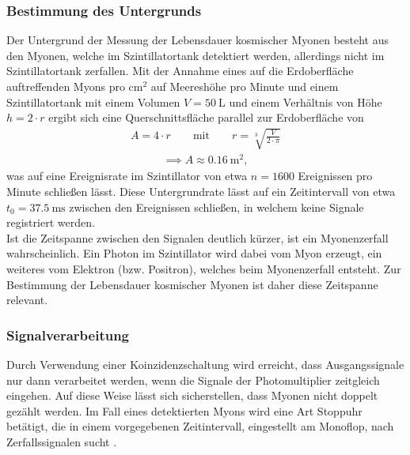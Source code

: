 \subsubsection{Bestimmung des Untergrunds}
\noindent Der Untergrund der Messung der Lebensdauer kosmischer Myonen besteht
aus den Myonen, welche im Szintillatortank detektiert werden, allerdings nicht
im Szintillatortank zerfallen. Mit der Annahme eines auf die Erdoberfläche
auftreffenden Myons pro $\si{\centi\meter^2}$ auf Meereshöhe pro Minute
\cite{grupen} und einem Szintillatortank mit einem Volumen $V = \SI{50}{\liter}$
und einem Verhältnis von Höhe  $h = 2 \cdot r$ \cite{anleitung} ergibt sich eine
Querschnittsfläche parallel zur Erdoberfläche von \\
\begin{align}
  A = 4 \cdot r \qquad \text{mit} \qquad r = \sqrt[3]{\frac{V}{2 \cdot \pi}}
  \label{eqn:03}
\end{align}
\begin{align*}
  \implies A \approx \SI{0.16}{\meter^2},
\end{align*}
\noindent was auf eine Ereignisrate im Szintillator von etwa $n = \num{1600}$
Ereignissen pro Minute schließen lässt. Diese Untergrundrate lässt auf ein
Zeitintervall von etwa $t_0 = \SI{37.5}{\milli\second}$ zwischen den Ereignissen
schließen, in welchem keine Signale registriert werden. \\
\newline
\noindent Ist die Zeitspanne zwischen den Signalen deutlich kürzer, ist ein
Myonenzerfall wahrscheinlich. Ein Photon im Szintillator wird dabei vom Myon
erzeugt, ein weiteres vom Elektron (bzw. Positron), welches beim Myonenzerfall
entsteht. Zur Bestimmung der Lebensdauer kosmischer Myonen ist daher diese
Zeitspanne relevant. \\
\subsubsection{Signalverarbeitung}
\noindent Durch Verwendung einer Koinzidenzschaltung wird erreicht, dass
Ausgangssignale nur dann verarbeitet werden, wenn die Signale der Photomultiplier
zeitgleich eingehen. Auf diese Weise lässt sich sicherstellen, dass Myonen nicht
doppelt gezählt werden. Im Fall eines detektierten Myons wird
eine Art Stoppuhr betätigt, die in einem vorgegebenen Zeitintervall, eingestellt
am Monoflop, nach Zerfallssignalen sucht \cite{anleitung}. \\
